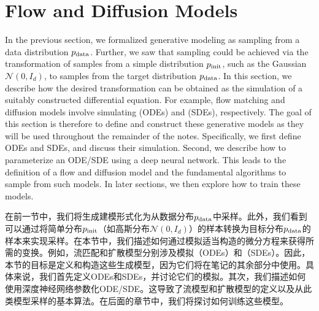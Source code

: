 \section{Flow and Diffusion Models}
\label{sec:odes_sdes}
In the previous section, we formalized generative modeling as sampling from a data distribution $p_{\rm{data}}$. Further, we saw that sampling could be achieved via the transformation of samples from a simple distribution $p_{\rm{init}}$, such as the Gaussian $\mathcal{N}(0,I_d)$, to samples from the target distribution $p_{\rm{data}}$. In this section, we describe how the desired transformation can be obtained as the simulation of a suitably constructed differential equation. For example, flow matching and diffusion models involve simulating  (ODEs) and  (SDEs), respectively. The goal of this section is therefore to define and construct these generative models as they will be used throughout the remainder of the notes. Specifically, we first define ODEs and SDEs, and discuss their simulation. Second, we describe how to parameterize an ODE/SDE using a deep neural network. This leads to the definition of a flow and diffusion model and the fundamental algorithms to sample from such models. In later sections, we then explore how to train these models.

在前一节中，我们将生成建模形式化为从数据分布$p_{\rm{data}}$中采样。此外，我们看到可以通过将简单分布$p_{\rm{init}}$（如高斯分布$\mathcal{N}(0,I_d)$）的样本转换为目标分布$p_{\rm{data}}$的样本来实现采样。在本节中，我们描述如何通过模拟适当构造的微分方程来获得所需的变换。例如，流匹配和扩散模型分别涉及模拟（ODEs）和（SDEs）。因此，本节的目标是定义和构造这些生成模型，因为它们将在笔记的其余部分中使用。具体来说，我们首先定义ODEs和SDEs，并讨论它们的模拟。其次，我们描述如何使用深度神经网络参数化ODE/SDE。这导致了流模型和扩散模型的定义以及从此类模型采样的基本算法。在后面的章节中，我们将探讨如何训练这些模型。



